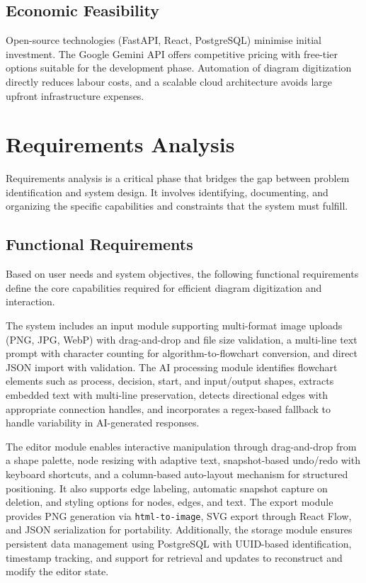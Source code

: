 \subsection{Economic Feasibility}
\label{sec:economic-feasibility}

Open-source technologies (FastAPI, React, PostgreSQL) minimise initial investment. The Google Gemini API offers competitive pricing with free-tier options suitable for the development phase. Automation of diagram digitization directly reduces labour costs, and a scalable cloud architecture avoids large upfront infrastructure expenses.

\section{Requirements Analysis}
\label{sec:requirements}

Requirements analysis is a critical phase that bridges the gap 
between problem identification and system design. It involves 
identifying, documenting, and organizing the specific capabilities 
and constraints that the system must fulfill.

\subsection{Functional Requirements}
\label{sec:functional-req}

Based on user needs and system objectives, the following functional 
requirements define the core capabilities required for efficient 
diagram digitization and interaction.

The system includes an input module supporting multi-format image 
uploads (PNG, JPG, WebP) with drag-and-drop and file size validation, 
a multi-line text prompt with character counting for algorithm-to-flowchart 
conversion, and direct JSON import with validation. The AI processing 
module identifies flowchart elements such as process, decision, start, 
and input/output shapes, extracts embedded text with multi-line 
preservation, detects directional edges with appropriate connection 
handles, and incorporates a regex-based fallback to handle variability 
in AI-generated responses.

The editor module enables interactive manipulation through drag-and-drop 
from a shape palette, node resizing with adaptive text, snapshot-based 
undo/redo with keyboard shortcuts, and a column-based auto-layout 
mechanism for structured positioning. It also supports edge labeling, 
automatic snapshot capture on deletion, and styling options for nodes, 
edges, and text. The export module provides PNG generation via 
\texttt{html-to-image}, SVG export through React Flow, and JSON 
serialization for portability. Additionally, the storage module ensures 
persistent data management using PostgreSQL with UUID-based identification, 
timestamp tracking, and support for retrieval and updates to reconstruct 
and modify the editor state.


